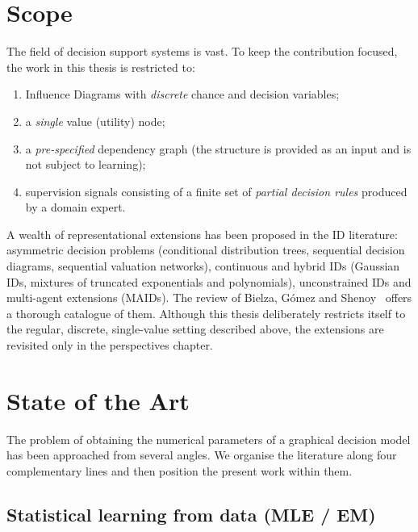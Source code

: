 \section{Scope}

The field of decision support systems is vast. To keep the
contribution focused, the work in this thesis is restricted to:
\begin{enumerate}
    \item Influence Diagrams with \emph{discrete} chance and decision
          variables;
    \item a \emph{single} value (utility) node;
    \item a \emph{pre-specified} dependency graph (the structure is
          provided as an input and is not subject to learning);
    \item supervision signals consisting of a finite set of
          \emph{partial decision rules} produced by a domain expert.
\end{enumerate}
A wealth of representational extensions has been proposed in the ID literature: asymmetric decision problems (conditional
distribution trees, sequential decision diagrams, sequential
valuation networks), continuous and hybrid IDs (Gaussian IDs,
mixtures of truncated exponentials and polynomials), unconstrained
IDs and multi-agent extensions (MAIDs). The review of Bielza,
G{\'o}mez and Shenoy~\cite{bielza2011review} offers a thorough
catalogue of them. Although this thesis deliberately restricts
itself to the regular, discrete, single-value setting described
above, the extensions are revisited only in the perspectives
chapter.

\section{State of the Art}
\label{sec:state-of-the-art}

The problem of obtaining the numerical parameters of a graphical
decision model has been approached from several angles. We organise
the literature along four complementary lines and then position the
present work within them.

\subsection{Statistical learning from data (MLE / EM)}


